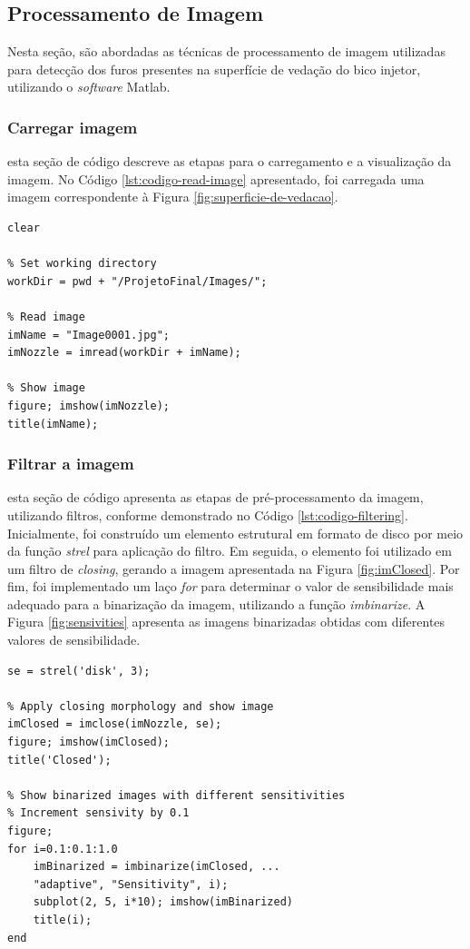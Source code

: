 \documentclass[conference]{IEEEtran}
\begin{document}
\subsection{Processamento de Imagem}

Nesta seção, são abordadas as técnicas de processamento de imagem utilizadas para detecção dos furos presentes na superfície de vedação do bico injetor, utilizando o \textit{software} Matlab.  

\subsubsection{Carregar imagem} esta seção de código descreve as etapas para o carregamento e a visualização da imagem. No Código \ref{lst:codigo-read-image} apresentado, foi carregada uma imagem correspondente à Figura \ref{fig:superficie-de-vedacao}. 

\begin{lstlisting}[caption={Carregamento e visualização da imagem}, label={lst:codigo-read-image}]
% Clear workspace
clear

% Set working directory
workDir = pwd + "/ProjetoFinal/Images/";

% Read image
imName = "Image0001.jpg";
imNozzle = imread(workDir + imName);

% Show image
figure; imshow(imNozzle);
title(imName);
\end{lstlisting}

\subsubsection{Filtrar a imagem} esta seção de código apresenta as etapas de pré-processamento da imagem, utilizando filtros, conforme demonstrado no Código \ref{lst:codigo-filtering}. Inicialmente, foi construído um elemento estrutural em formato de disco por meio da função \textit{strel} para aplicação do filtro. Em seguida, o elemento foi utilizado em um filtro de \textit{closing}, gerando a imagem apresentada na Figura \ref{fig:imClosed}. Por fim, foi implementado um laço \textit{for} para determinar o valor de sensibilidade mais adequado para a binarização da imagem, utilizando a função \textit{imbinarize}. A Figura \ref{fig:sensivities} apresenta as imagens binarizadas obtidas com diferentes valores de sensibilidade.

\begin{lstlisting}[caption={Filtragem e análise da sensibilidade para binarização}, label={lst:codigo-filtering}]
% Create structuring element
se = strel('disk', 3);

% Apply closing morphology and show image
imClosed = imclose(imNozzle, se);
figure; imshow(imClosed);
title('Closed');

% Show binarized images with different sensitivities
% Increment sensivity by 0.1
figure;
for i=0.1:0.1:1.0
	imBinarized = imbinarize(imClosed, ...
	"adaptive", "Sensitivity", i); 
	subplot(2, 5, i*10); imshow(imBinarized)
	title(i);
end
\end{lstlisting}
\end{document}

